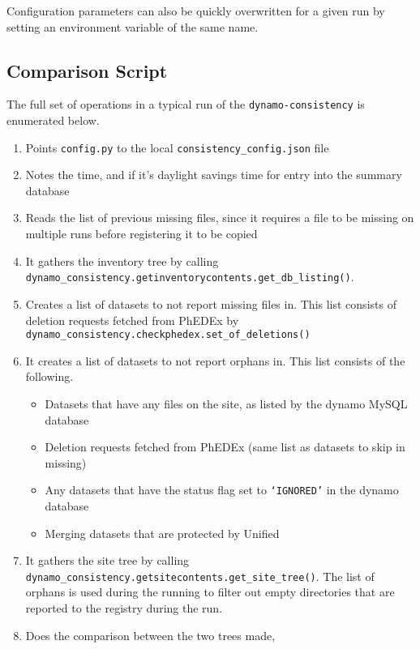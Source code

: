 Configuration parameters can also be quickly overwritten for a given run by
setting an environment variable of the same name.

\subsection{Comparison Script}

The full set of operations in a typical run of the \texttt{dynamo-consistency}
is enumerated below.
\begin{enumerate}
\item Points \texttt{config.py} to the local \texttt{consistency\_config.json} file
\item Notes the time, and if it’s daylight savings time for entry into the summary database
\item Reads the list of previous missing files,
  since it requires a file to be missing on multiple
  runs before registering it to be copied
\item It gathers the inventory tree by calling \\
  \texttt{dynamo\_consistency.getinventorycontents.get\_db\_listing()}.
\item Creates a list of datasets to not report missing files in.
  This list consists of deletion requests fetched from PhEDEx by \\
  \texttt{dynamo\_consistency.checkphedex.set\_of\_deletions()}
\item It creates a list of datasets to not report orphans in.
  This list consists of the following.
  \begin{itemize}
  \item Datasets that have any files on the site, as listed by the dynamo MySQL database
  \item Deletion requests fetched from PhEDEx (same list as datasets to skip in missing)
  \item Any datasets that have the status flag set to \texttt{`IGNORED'}
    in the dynamo database
  \item Merging datasets that are protected by Unified
  \end{itemize}
\item It gathers the site tree by calling \\
  \texttt{dynamo\_consistency.getsitecontents.get\_site\_tree()}.
  The list of orphans is used during the running to filter out empty directories that are
  reported to the registry during the run.
\item Does the comparison between the two trees made,

\end{enumerate}
